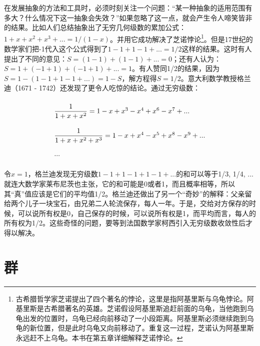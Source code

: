 \documentclass[b5paper]{ctexart}
\begin{document}
在发展抽象的方法和工具时，必须时刻关注一个问题：“某一种抽象的适用范围有多大？什么情况下这一抽象会失效？”如果忽略了这一点，就会产生令人啼笑皆非的结果。比如人们总结抽象出了无穷几何级数的累加公式：$1 + x + x^2 + x^3 + ... = 1/(1-x)$。并用它成功解决了芝诺悖论\footnote{古希腊哲学家芝诺提出了四个著名的悖论，这里是指阿基里斯与乌龟悖论。阿基里斯是古希腊著名的英雄。芝诺假设阿基里斯追赶前面的乌龟，当他跑到乌龟出发的位置时，乌龟已经向前移动了一小段距离。阿基里斯必须继续跑到乌龟的新位置，但是此时乌龟又向前移动了。重复这一过程，芝诺认为阿基里斯永远赶不上乌龟。本书在第五章详细解释芝诺悖论。}。但是17世纪的数学家们把-1代入这个公式得到了$1 - 1 + 1 - 1 + ... = 1/2$这样的结果。这时有人提出了不同的意见：$S = (1 - 1) + (1 - 1) + ... = 0$；还有人认为：$S = 1 + (-1 + 1) + (-1 + 1) + ... = 1$。有人赞同1/2的结果，因为$S = 1 - (1 - 1 + 1 - 1 + ...) = 1 -S$，解方程得$S = 1/2$。意大利数学教授格兰迪（1671 - 1742）还发现了更令人吃惊的结论。通过无穷级数：

\[
\def\arraystretch{2.2}
\begin{array}{l}
\dfrac{1}{1 + x + x^2} = 1 - x + x^3 - x^4 + x^6 - x^7 + ... \\[2ex]
\dfrac{1}{1 + x + x^2 + x^3} = 1 - x + x^4 - x^5 + x^8 - x^9 + ... \\
...
\end{array}
\]

令$x = 1$，格兰迪发现无穷级数$1 - 1 + 1 - 1 + 1 - 1 + ...$的和可以等于1/3, 1/4, ...就连大数学家莱布尼茨也主张，它的和可能是0或者1，而且概率相等，所以其“真”值应该是它们的平均值1/2。格兰迪还做出了另一个“奇妙”的解释：父亲留给两个儿子一块宝石，由兄弟二人轮流保存，每人一年。于是，交给对方保存的时候，可以说所有权是0，自己保存的时候，可以说所有权是1，而平均而言，每人的所有权为1/2\cite{HanXueTao16}。这些奇怪的问题，要等到法国数学家柯西引入无穷级数收敛性后才得以解决。

\section{群}
\end{document}
